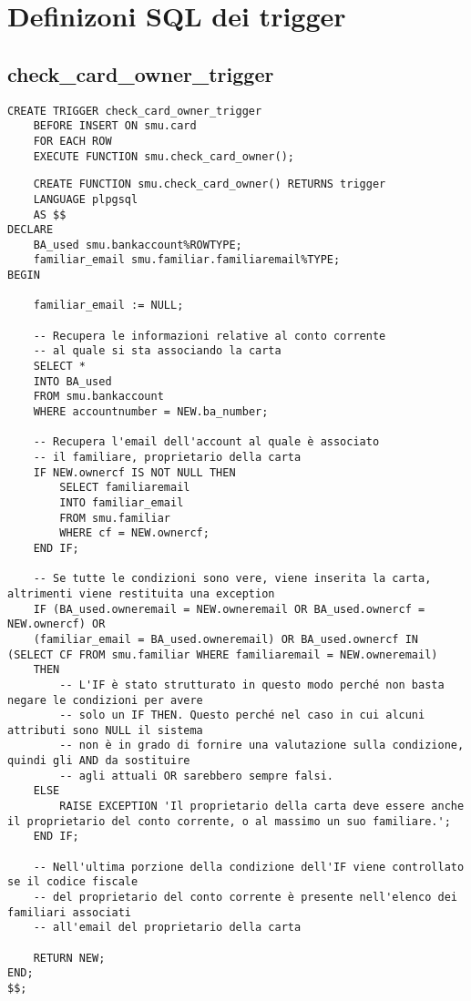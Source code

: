 \section{Definizoni SQL dei trigger}

\subsection{check\_card\_owner\_trigger}

\begin{lstlisting}
CREATE TRIGGER check_card_owner_trigger
    BEFORE INSERT ON smu.card
    FOR EACH ROW
    EXECUTE FUNCTION smu.check_card_owner();
\end{lstlisting}

\begin{lstlisting}
    CREATE FUNCTION smu.check_card_owner() RETURNS trigger
    LANGUAGE plpgsql
    AS $$
DECLARE
    BA_used smu.bankaccount%ROWTYPE;
    familiar_email smu.familiar.familiaremail%TYPE;
BEGIN

    familiar_email := NULL;

    -- Recupera le informazioni relative al conto corrente
    -- al quale si sta associando la carta
    SELECT *
    INTO BA_used
    FROM smu.bankaccount
    WHERE accountnumber = NEW.ba_number;

    -- Recupera l'email dell'account al quale è associato
    -- il familiare, proprietario della carta
    IF NEW.ownercf IS NOT NULL THEN
        SELECT familiaremail
        INTO familiar_email
        FROM smu.familiar
        WHERE cf = NEW.ownercf;
    END IF;

    -- Se tutte le condizioni sono vere, viene inserita la carta, altrimenti viene restituita una exception
    IF (BA_used.owneremail = NEW.owneremail OR BA_used.ownercf = NEW.ownercf) OR
    (familiar_email = BA_used.owneremail) OR BA_used.ownercf IN (SELECT CF FROM smu.familiar WHERE familiaremail = NEW.owneremail)
    THEN
        -- L'IF è stato strutturato in questo modo perché non basta negare le condizioni per avere
        -- solo un IF THEN. Questo perché nel caso in cui alcuni attributi sono NULL il sistema
        -- non è in grado di fornire una valutazione sulla condizione, quindi gli AND da sostituire
        -- agli attuali OR sarebbero sempre falsi.
    ELSE
        RAISE EXCEPTION 'Il proprietario della carta deve essere anche il proprietario del conto corrente, o al massimo un suo familiare.';
    END IF;

    -- Nell'ultima porzione della condizione dell'IF viene controllato se il codice fiscale
    -- del proprietario del conto corrente è presente nell'elenco dei familiari associati
    -- all'email del proprietario della carta

    RETURN NEW;
END;
$$;
\end{lstlisting}

